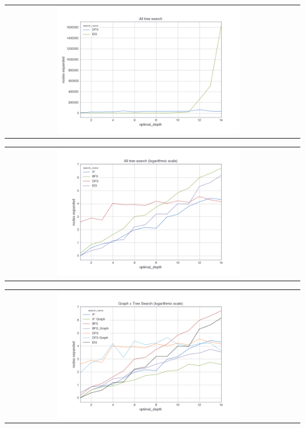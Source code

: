 \documentclass[10pt]{article}
\begin{document}
  \begin{center}
    \begin{tabular}{cc}
    \includegraphics[width=0.65\textwidth]{images/dfs_ids.png} \\
      \end{tabular}
    \end{center}

  \begin{center}
    \begin{tabular}{cc}
    \includegraphics[width=0.65\textwidth]{images/tree_log.png} \\
      \end{tabular}
    \end{center}

  \begin{center}
    \begin{tabular}{cc}
    \includegraphics[width=0.65\textwidth]{images/all_logged.png} \\
      \end{tabular}
    \end{center}
\end{document}
